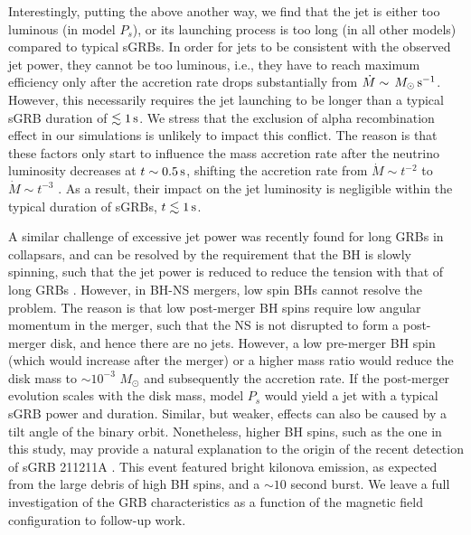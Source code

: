 \documentclass[twocolumn,dvipsnames]{aastex62}
\newcommand{\msun}{\,{M_{\odot}}}
\begin{document}
Interestingly, putting the above another way, we find that the jet is either too luminous (in model $ P_s $), or its launching process is too long (in all other models) compared to typical sGRBs. In order for jets to be consistent with the observed jet power, they cannot be too luminous, i.e., they have to reach maximum efficiency only after the accretion rate drops substantially from $ \dot{M} \sim \msun\,{\rm s}^{-1} $. However, this necessarily requires the jet launching to be longer than a typical sGRB duration of $\lesssim 1\,{\rm s}$. We stress that the exclusion of alpha recombination effect in our simulations is unlikely to impact this conflict. The reason is that these factors only start to influence the mass accretion rate after the neutrino luminosity decreases at $ t \sim 0.5\,{\rm s}$, shifting the accretion rate from $ \dot{M} \sim t^{-2} $ to $ \dot{M} \sim t^{-3} $ \citep{Haddadi2023}. As a result, their impact on the jet luminosity is negligible within the typical duration of sGRBs, $ t \lesssim 1\,{\rm s}$.

A similar challenge of excessive jet power was recently found for long GRBs in collapsars, and can be resolved by the requirement that the BH is slowly spinning, such that the jet power is reduced to reduce the tension with that of long GRBs \citep{Gottlieb2023}. However, in BH-NS mergers, low spin BHs cannot resolve the problem. The reason is that low post-merger BH spins require low angular momentum in the merger, such that the NS is not disrupted to form a post-merger disk, and hence there are no jets. However, a low pre-merger BH spin (which would increase after the merger) or a higher mass ratio would reduce the disk mass to $ \sim 10^{-3}\,\msun $ and subsequently the accretion rate. If the post-merger evolution scales with the disk mass, model $ P_s $ would yield a jet with a typical sGRB power and duration. Similar, but weaker, effects can also be caused by a tilt angle of the binary orbit. Nonetheless, higher BH spins, such as the one in this study, may provide a natural explanation to the origin of the recent detection of sGRB 211211A \citep[e.g.,][]{Rastinejad2022,Troja2022,Yang2022}. This event featured bright kilonova emission, as expected from the large debris of high BH spins, and a $ \sim 10 $ second burst. We leave a full investigation of the GRB characteristics as a function of the magnetic field configuration to follow-up work.
\end{document}
